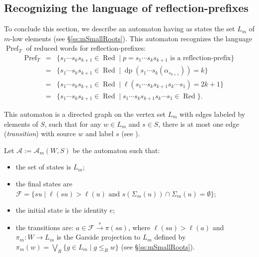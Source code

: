 \documentclass{amsart}
\theoremstyle{definition}
\newcommand{\Red}{{\operatorname{Red}}}
\newcommand{\dep}{\operatorname{dp}}
\newcommand{\Pref}{\operatorname{Pref}}
\begin{document}
\subsection{Recognizing the language of reflection-prefixes}\label{ss:Automaton}
To conclude this section, we describe an automaton having as states the set $L_m$ of $m$-low elements (see \S\ref{ss:mSmallRoots}). This automaton recognizes the language $\Pref_T$ of reduced words for reflection-prefixes:
\begin{eqnarray*}
\Pref_T&=&\{s_1\cdots s_k s_{k+1}\in \Red\mid p=s_1\cdots s_ks_{k+1}\textrm{ is a reflection-prefix} \}\\
&=&\{s_1\cdots s_k s_{k+1}\in \Red\mid \dep(s_1\cdots s_k(\alpha_{s_{k+1}}))=k  \}\\
&=&\{s_1\cdots s_k s_{k+1}\in \Red\mid \ell( s_1\cdots  s_k s_{k+1} s_k\cdots  s_1)=2k+1\}\\
&=&\{s_1\cdots s_k s_{k+1}\in \Red\mid s_1\cdots s_k s_{k+1} s_k\cdots s_1\in \Red\}.
\end{eqnarray*}

This automaton is a directed graph on the vertex set $L_m$ with edges labeled by elements of $S$, such that for any $w \in L_m$ and $s \in S$, there is at most one edge (\textit{transition}) with source $w$ and label $s$ (see \cite[\S 2]{HNW}).

Let $\mathcal{A}:=\mathcal{A}_m(W,S)$ be the automaton such that:
\begin{itemize}
\item the set of states is $L_m$;
\item the final states are $\mathcal{F}=\{su \mid \ell(su)>\ell(u) \mbox{ and } s(\Sigma_m(u))\cap \Sigma_m (u) = \emptyset\}$;
\item the initial state is the identity $e$;
\item the transitions are: $a\in \mathcal{F} \xrightarrow{s} \pi(sa)$, where $\ell(sa)>\ell(a)$ and $\pi_m: W\rightarrow L_m$ is the Garside projection to $L_m$ defined by $\pi_m(w)= \bigvee_R \{g\in L_m\mid g\leq_R w\}$ (see \S\ref{ss:mSmallRoots}).
\end{itemize}
\end{document}
